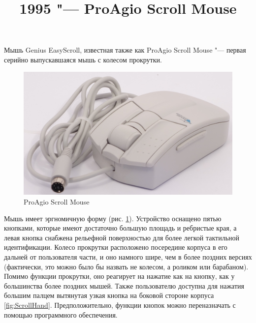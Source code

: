 \documentclass[11pt, a4paper]{article}
\begin{document}
\title{1995 "--- ProAgio Scroll Mouse}
\date{}
\maketitle

Мышь Genius EasyScroll, известная также как ProAgio Scroll Mouse "--- первая серийно выпускавшаяся мышь с колесом прокрутки.

\begin{figure}[h]
    \centering
    \includegraphics[scale=0.5]{1995_pro_agio_scroll_mouse/4.1.jpg}
    \caption{ProAgio Scroll Mouse}
    \label{fig:ScrollPic}
\end{figure}


Мышь имеет эргномичную форму (рис. \ref{fig:ScrollPic}). Устройство оснащено пятью кнопками, которые имеют достаточно большую площадь и ребристые края, а левая кнопка снабжена рельефной поверхностью для более легкой тактильной идентификации. Колесо прокрутки расположено посередине корпуса в его дальней от пользователя части, и оно намного шире, чем в более поздних версиях (фактически, это можно было бы назвать не колесом, а роликом или барабаном). Помимо функции прокрутки, оно реагирует на нажатие как на кнопку, как у большинства более поздних мышей. Также пользователю доступна для нажатия большим палцем вытянутая узкая кнопка на боковой стороне корпуса \ref{fig:ScrollHand}. Предположительно, функции кнопок можно переназначать с помощью программного обеспечения.
\end{document}
